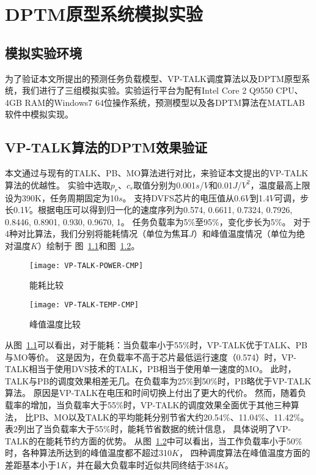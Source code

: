 


\chapter{DPTM原型系统模拟实验}
\label{cha:DPTMexperiments}

\section{模拟实验环境}
为了验证本文所提出的预测任务负载模型、VP-TALK调度算法以及DPTM原型系统，我们进行了三组模拟实验。实验运行平台为配有Intel Core 2 Q9550 CPU、4GB RAM的Windows7 64位操作系统，预测模型以及各DPTM算法在MATLAB软件中模拟实现。

\section{VP-TALK算法的DPTM效果验证}
本文通过与现有的TALK、PB、MO算法进行对比，来验证本文提出的VP-TALK算法的优越性。 实验中选取$p_r$、$c_r$取值分别为0.001$s$/$V$和0.01$J$/$V^2$，温度最高上限设为390K，任务周期固定为10$s$。 支持DVFS芯片的电压值从0.6$V$到1.4$V$可调，步长0.1$V$。根据电压可以得到归一化的速度序列为{0.574, 0.6611, 0.7324, 0.7926, 0.8446, 0.8901, 0.930, 0.9670, 1}。 任务负载率为5\%至95\%，变化步长为5\%。 对于4种对比算法，我们分别将能耗情况（单位为焦耳$J$）和峰值温度情况（单位为绝对温度$K$）绘制于 图~\ref{fig:vp-talk-power-cmp}和图~\ref{fig:vp-talk-temp-cmp}。
\begin{figure}[H]
  \centering
  \texttt{[image: VP-TALK-POWER-CMP]}
  \caption{能耗比较}
  \label{fig:vp-talk-power-cmp}
\end{figure}
\begin{figure}[H]
  \centering
  \texttt{[image: VP-TALK-TEMP-CMP]}
  \caption{峰值温度比较}
  \label{fig:vp-talk-temp-cmp}
\end{figure}
从图~\ref{fig:vp-talk-power-cmp}可以看出，对于能耗：当负载率小于55\%时，VP-TALK优于TALK、PB与MO等价。 这是因为，在负载率不高于芯片最低运行速度（0.574）时，VP-TALK相当于使用DVS技术的TALK，PB相当于使用单一速度的MO。 此时，TALK与PB的调度效果相差无几。在负载率为25\%到50\%时，PB略优于VP-TALK算法。 原因是VP-TALK在电压和时间切换上付出了更大的代价。 然而，随着负载率的增加，当负载率大于55\%时，VP-TALK的调度效果全面优于其他三种算法， 比PB、MO以及TALK的平均能耗分别节省大约20.54\%、11.04\%、11.42\%。表2列出了当负载率大于55\%时，能耗节省数据的统计信息， 具体说明了VP-TALK的在能耗节约方面的优势。
从图~\ref{fig:vp-talk-temp-cmp}中可以看出，当工作负载率小于50\%时，各种算法所达到的峰值温度都不超过310$K$， 四种调度算法在峰值温度方面的差距基本小于1$K$，并在最大负载率时近似共同终结于384$K$。


